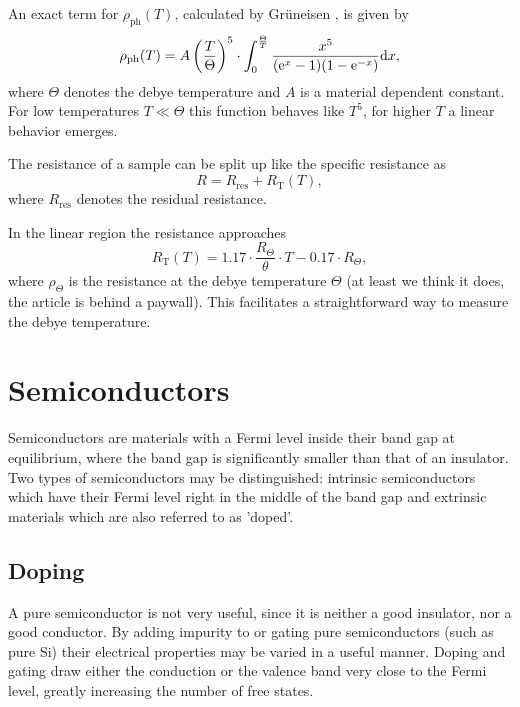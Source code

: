 An exact term for $\rho_\text{ph}(T)$, calculated by Grüneisen \cite{elresistancemetal}, is given by
\begin{equation}
	\rho_\text{ph}(T) = A \left(\frac{T}{\Theta}\right)^5 \cdot \int_0^\frac{\Theta}{T}\frac{x^5}{(\mathrm{e}^x - 1)(1 - \mathrm{e}^{-x})} \text{d} x,
\end{equation}
where $\Theta$ denotes the debye temperature and $A$ is a material dependent constant.
For low temperatures $T \ll \Theta$ this function behaves like $T^5$, for higher $T$ a linear behavior emerges.

The resistance of a sample can be split up like the specific resistance as
\begin{equation*}
	R = R_\text{res} + R_\text{T}(T),
\end{equation*}
where $R_\text{res}$ denotes the residual resistance.

In the linear region the resistance approaches \cite{elresistancemetal}
\begin{equation}
	R_\text{T}(T) = \num{1.17} \cdot \frac{R_\Theta}{\theta} \cdot T - \num{0.17} \cdot R_\Theta,
\end{equation}
where $\rho_\Theta$ is the resistance at the debye temperature $\Theta$ (at least we think it does, the article is behind a paywall).
This facilitates a straightforward way to measure the debye temperature.

\section{Semiconductors}
Semiconductors are materials with a Fermi level inside their band gap at equilibrium, where the band gap is significantly smaller than that of an insulator.
Two types of semiconductors may be distinguished: intrinsic semiconductors which have their Fermi level right in the middle of the band gap and extrinsic materials which are also referred to as 'doped'.

\subsection{Doping}
A pure semiconductor is not very useful, since it is neither a good insulator, nor a good conductor.
By adding impurity to or gating pure semiconductors (such as pure Si) their electrical properties may be varied in a useful manner.
Doping and gating draw either the conduction or the valence band very close to the Fermi level, greatly increasing the number of free states.

